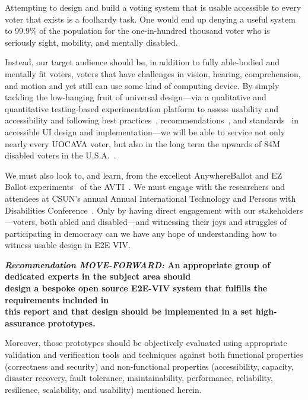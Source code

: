 Attempting to design and build a voting system that is usable
accessible to every voter that exists is a foolhardy task. One would
end up denying a useful system to 99.9\% of the population for the
one-in-hundred thousand voter who is seriously sight, mobility, and
mentally disabled. 

Instead, our target audience should be, in addition to fully
able-bodied and mentally fit voters, voters that have challenges in
vision, hearing, comprehension, and motion and yet still can use some
kind of computing device. By simply tackling the low-hanging fruit of
universal design---via a qualitative and quantitative testing-based
experimentation platform to assess usability and accessibility and
following best practices~\cite{materials-at-elections.itif.org},
recommendations~\cite{WAI,Section508,WAVE}, and
standards~\cite{standards} in accessible UI design and
implementation---we will be able to service not only nearly every
UOCAVA voter, but also in the long term the upwards of 84M disabled
voters in the U.S.A.~\cite{Brennen,CensusData}. 

We must also look to, and learn, from the excellent AnywhereBallot and
EZ Ballot experiments~\cite{AnywhereBallot,EZBallot} of the
AVTI~\cite{AVTI}.  We must engage with the researchers and attendees
at CSUN's annual Annual International Technology and Persons with
Disabilities Conference~\cite{CSUN}. Only by having direct engagement
with our stakeholders---voters, both abled and disabled---and
witnessing their joys and struggles of participating in democracy can
we have any hope of understanding how to witness usable design in
E2E VIV.

\begin{center}
  \textbf{\emph{Recommendation MOVE-FORWARD:} An appropriate group of dedicated
    experts in the subject area should\\
    design a bespoke open source E2E-VIV system that fulfills the
    requirements included in\\
    this report and that design should be implemented in a set
    high-assurance prototypes.}
\end{center}

Moreover, those prototypes should be objectively evaluated using
appropriate validation and verification tools and techniques against
both functional properties (correctness and security) and
non-functional properties (accessibility, capacity, disaster recovery,
fault tolerance, maintainability, performance, reliability,
resilience, scalability, and usability) mentioned herein.

